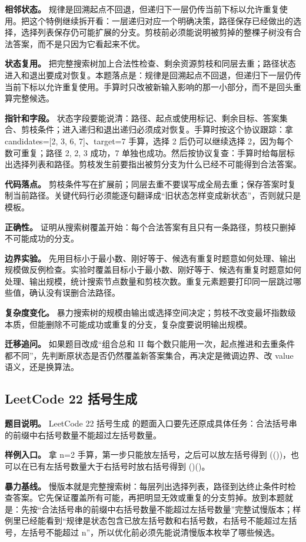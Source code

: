 \textbf{相邻状态。} 规律是回溯起点不回退，但递归下一层仍传当前下标以允许重复使用。把这个特例继续拆开看：一层递归对应一个明确决策，路径保存已经做出的选择，选择列表保存仍可能扩展的分支。剪枝前必须能说明被剪掉的整棵子树没有合法答案，而不是只因为它看起来不优。

\textbf{状态复用。} 把完整搜索树加上合法性检查、剩余资源剪枝和同层去重；路径状态进入和退出要成对恢复。本题落点是：规律是回溯起点不回退，但递归下一层仍传当前下标以允许重复使用。手算时只改被新输入影响的那一小部分，而不是回头重算完整候选。

\textbf{指针和字段。} 状态字段要能说清：路径、起点或使用标记、剩余目标、答案集合、剪枝条件；进入递归和退出递归必须成对恢复。手算时按这个协议跟踪：拿 candidates=[2, 3, 6, 7]、target=7 手算，选择 2 后仍可以继续选择 2，因为每个数可重复；路径 2, 2, 3 成功，7 单独也成功。然后按协议复查：手算时给每层标出选择列表和路径。剪枝发生前要指出被剪分支为什么已经不可能得到合法答案。

\textbf{代码落点。} 剪枝条件写在扩展前；同层去重不要误写成全局去重；保存答案时复制当前路径。关键代码行必须能逐句翻译成“旧状态怎样变成新状态”，否则就只是模板。

\textbf{正确性。} 证明从搜索树覆盖开始：每个合法答案有且只有一条路径，剪枝只删掉不可能成功的分支。

\textbf{边界实验。} 先用目标小于最小数、刚好等于、候选有重复时题意如何处理、输出规模做反例检查。实验时覆盖目标小于最小数、刚好等于、候选有重复时题意如何处理、输出规模，统计搜索节点数量和剪枝次数。重复元素题要打印同一层跳过哪些值，确认没有误删合法路径。

\textbf{复杂度变化。} 暴力搜索树的规模由输出或选择空间决定；剪枝不改变最坏指数级本质，但能删除不可能成功或重复的分支，复杂度要说明输出规模。

\textbf{迁移追问。} 如果题目改成“组合总和 II 每个数只能用一次，起点推进和去重条件都不同”，先判断原状态是否仍然覆盖新答案集合，再决定是微调边界、改 value 语义，还是换算法。

\subsection{LeetCode 22 括号生成}

\textbf{题目说明。} LeetCode 22 括号生成 的题面入口要先还原成具体任务：合法括号串的前缀中右括号数量不能超过左括号数量。

\textbf{样例入口。} 拿 n=2 手算，第一步只能放左括号，之后可以放左括号得到 (())，也可以在已有左括号数量大于右括号时放右括号得到 ()()。

\textbf{暴力基线。} 慢版本就是完整搜索树：每层列出选择列表，路径到达终止条件时检查答案。它先保证覆盖所有可能，再把明显无效或重复的分支剪掉。放到本题就是：先按“合法括号串的前缀中右括号数量不能超过左括号数量”完整试慢版本；样例里已经能看到“规律是状态包含已放左括号数和右括号数，右括号不能超过左括号，左括号不能超过 n”，所以优化前必须先能说清慢版本枚举了哪些候选。


